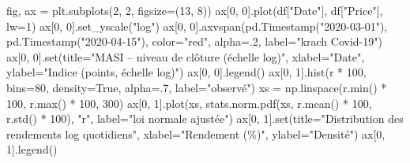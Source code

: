 \documentclass[
  10pt,
]{article}
\newenvironment{Shaded}{}{}
\newcommand{\BuiltInTok}[1]{\textcolor[rgb]{0.00,0.50,0.00}{#1}}
\newcommand{\DecValTok}[1]{\textcolor[rgb]{0.25,0.63,0.44}{#1}}
\newcommand{\FloatTok}[1]{\textcolor[rgb]{0.25,0.63,0.44}{#1}}
\newcommand{\NormalTok}[1]{#1}
\newcommand{\OperatorTok}[1]{\textcolor[rgb]{0.40,0.40,0.40}{#1}}
\newcommand{\StringTok}[1]{\textcolor[rgb]{0.25,0.44,0.63}{#1}}
\newcommand{\VariableTok}[1]{\textcolor[rgb]{0.10,0.09,0.49}{#1}}
\begin{document}
\begin{Shaded}
\begin{Highlighting}[]
\NormalTok{fig, ax }\OperatorTok{=}\NormalTok{ plt.subplots(}\DecValTok{2}\NormalTok{, }\DecValTok{2}\NormalTok{, figsize}\OperatorTok{=}\NormalTok{(}\DecValTok{13}\NormalTok{, }\DecValTok{8}\NormalTok{))}
\NormalTok{ax[}\DecValTok{0}\NormalTok{, }\DecValTok{0}\NormalTok{].plot(df[}\StringTok{"Date"}\NormalTok{], df[}\StringTok{"Price"}\NormalTok{], lw}\OperatorTok{=}\DecValTok{1}\NormalTok{)}
\NormalTok{ax[}\DecValTok{0}\NormalTok{, }\DecValTok{0}\NormalTok{].set\_yscale(}\StringTok{"log"}\NormalTok{)}
\NormalTok{ax[}\DecValTok{0}\NormalTok{, }\DecValTok{0}\NormalTok{].axvspan(pd.Timestamp(}\StringTok{"2020{-}03{-}01"}\NormalTok{), pd.Timestamp(}\StringTok{"2020{-}04{-}15"}\NormalTok{), color}\OperatorTok{=}\StringTok{"red"}\NormalTok{, alpha}\OperatorTok{=}\FloatTok{.2}\NormalTok{, label}\OperatorTok{=}\StringTok{"krach Covid{-}19"}\NormalTok{)}
\NormalTok{ax[}\DecValTok{0}\NormalTok{, }\DecValTok{0}\NormalTok{].}\BuiltInTok{set}\NormalTok{(title}\OperatorTok{=}\StringTok{"MASI – niveau de clôture (échelle log)"}\NormalTok{, xlabel}\OperatorTok{=}\StringTok{"Date"}\NormalTok{, ylabel}\OperatorTok{=}\StringTok{"Indice (points, échelle log)"}\NormalTok{)}
\NormalTok{ax[}\DecValTok{0}\NormalTok{, }\DecValTok{0}\NormalTok{].legend()}
\NormalTok{ax[}\DecValTok{0}\NormalTok{, }\DecValTok{1}\NormalTok{].hist(r }\OperatorTok{*} \DecValTok{100}\NormalTok{, bins}\OperatorTok{=}\DecValTok{80}\NormalTok{, density}\OperatorTok{=}\VariableTok{True}\NormalTok{, alpha}\OperatorTok{=}\FloatTok{.7}\NormalTok{, label}\OperatorTok{=}\StringTok{"observé"}\NormalTok{)}
\NormalTok{xs }\OperatorTok{=}\NormalTok{ np.linspace(r.}\BuiltInTok{min}\NormalTok{() }\OperatorTok{*} \DecValTok{100}\NormalTok{, r.}\BuiltInTok{max}\NormalTok{() }\OperatorTok{*} \DecValTok{100}\NormalTok{, }\DecValTok{300}\NormalTok{)}
\NormalTok{ax[}\DecValTok{0}\NormalTok{, }\DecValTok{1}\NormalTok{].plot(xs, stats.norm.pdf(xs, r.mean() }\OperatorTok{*} \DecValTok{100}\NormalTok{, r.std() }\OperatorTok{*} \DecValTok{100}\NormalTok{), }\StringTok{"r"}\NormalTok{, label}\OperatorTok{=}\StringTok{"loi normale ajustée"}\NormalTok{)}
\NormalTok{ax[}\DecValTok{0}\NormalTok{, }\DecValTok{1}\NormalTok{].}\BuiltInTok{set}\NormalTok{(title}\OperatorTok{=}\StringTok{"Distribution des rendements log quotidiens"}\NormalTok{, xlabel}\OperatorTok{=}\StringTok{"Rendement (\%)"}\NormalTok{, ylabel}\OperatorTok{=}\StringTok{"Densité"}\NormalTok{)}
\NormalTok{ax[}\DecValTok{0}\NormalTok{, }\DecValTok{1}\NormalTok{].legend()}

\end{Highlighting}
\end{Shaded}
\end{document}
